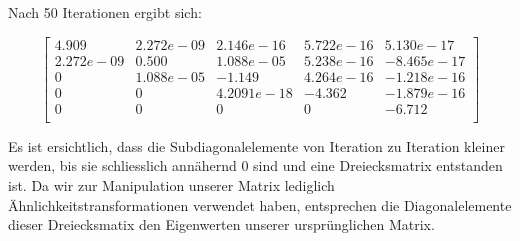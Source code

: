 Nach 50 Iterationen ergibt sich:

\begin{equation}
\begin{bmatrix}
4.909 & 2.272e-09	& 2.146e-16 & 5.722e-16 & 5.130e-17\\
2.272e-09 & 0.500 & 1.088e-05 & 5.238e-16 & -8.465e-17\\
0 & 1.088e-05 & -1.149 & 4.264e-16 & -1.218e-16\\
0 & 0 & 4.2091e-18 & -4.362 & -1.879e-16\\
0 & 0 & 0 & 0 &-6.712\\
\end{bmatrix}
\end{equation}

Es ist ersichtlich, dass die Subdiagonalelemente von Iteration zu Iteration kleiner werden, bis sie schliesslich annähernd 0 sind und eine Dreiecksmatrix entstanden ist.
Da wir zur Manipulation unserer Matrix lediglich Ähnlichkeitstransformationen verwendet haben, entsprechen die Diagonalelemente dieser Dreiecksmatix den Eigenwerten unserer ursprünglichen Matrix.
